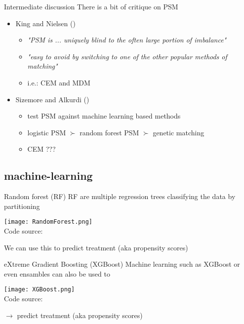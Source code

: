 \documentclass[aspectratio=169]{beamer}
\begin{document}
		\begin{frame}{Intermediate discussion}
			There is a bit of critique on PSM
			\begin{itemize}
				\item King and Nielsen (\citeyear{King2019})
				\begin{itemize}
					\item \textit{"PSM is ... uniquely blind to the often large portion of imbalance"}
					\item \textit{"easy to avoid by switching to one of the other popular methods of matching"}
					\item i.e.: CEM and MDM
				\end{itemize}
				\item Sizemore and Alkurdi (\citeyear{Sizemore2019})
				\begin{itemize}
					\item test PSM against machine learning based methods
					\item logistic PSM $\succ$ random forest PSM  $\succ$ genetic matching
					\item CEM ???
				\end{itemize}
			\end{itemize}
		\end{frame}

	\subsection{machine-learning}
		\begin{frame}{Random forest (RF)}
			RF are multiple regression trees classifying the data by partitioning
			\begin{center}
				\texttt{[image: RandomForest.png]}
				\\\tiny{Code source: \href{https://en.wikipedia.org/wiki/Random_forest}{\underline{}}}
			\end{center}
			We can use this to predict treatment (aka propensity scores)
		\end{frame}

		\begin{frame}{eXtreme Gradient Boosting (XGBoost)}
			Machine learning such as XGBoost or even ensambles can also be used to
			\begin{center}
				\texttt{[image: XGBoost.png]}
				\\\tiny{Code source: \href{https://blog.quantinsti.com/xgboost-python/}{\underline{}}}
			\end{center}
			$\rightarrow$ predict treatment (aka propensity scores)
		\end{frame}
\end{document}
